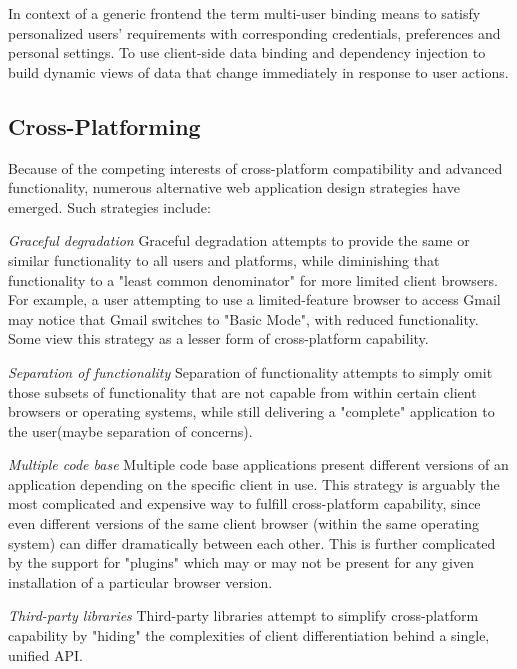 	In context of a generic frontend the term multi-user binding means to satisfy personalized users' requirements with corresponding credentials, preferences and personal settings. To use client-side data binding and dependency injection to build dynamic views of data that change immediately in response to user actions.

\subsection {Cross-Platforming}
	Because of the competing interests of cross-platform compatibility and advanced functionality, numerous alternative web application design strategies have emerged. Such strategies include:

	\emph{Graceful degradation}
	\newline
	Graceful degradation attempts to provide the same or similar functionality to all users and platforms, while diminishing that functionality to a "least common denominator" for more limited client browsers. For example, a user attempting to use a limited-feature browser to access Gmail may notice that Gmail switches to "Basic Mode", with reduced functionality. Some view this strategy as a lesser form of cross-platform capability.

	\emph{Separation of functionality}
	\newline
	Separation of functionality attempts to simply omit those subsets of functionality that are not capable from within certain client browsers or operating systems, while still delivering a "complete" application to the user(maybe separation of concerns).

	\emph{Multiple code base}
	\newline
	Multiple code base applications present different versions of an application depending on the specific client in use. This strategy is arguably the most complicated and expensive way to fulfill cross-platform capability, since even different versions of the same client browser (within the same operating system) can differ dramatically between each other. This is further complicated by the support for "plugins" which may or may not be present for any given installation of a particular browser version.

	\emph{Third-party libraries}
	\newline
	Third-party libraries attempt to simplify cross-platform capability by "hiding" the complexities of client differentiation behind a single, unified API.


